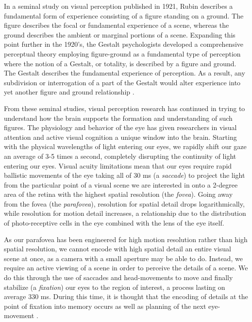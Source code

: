 \documentclass[a4paper,10pt,final]{ThesisStyle}
\begin{document}
In a seminal study on visual perception published in 1921, Rubin describes a fundamental form of experience consisting of a figure standing on a ground.  The figure describes the focal or fundamental experience of a scene, whereas the ground describes the ambient or marginal portions of a scene.  Expanding this point further in the 1920's, the Gestalt psychologists developed a comprehensive perceptual theory employing figure-ground as a fundamental type of perception where the notion of a Gestalt, or totality, is described by a figure and ground.  The Gestalt describes the fundamental experience of perception.  As a result, any subdivision or interrogation of a part of the Gestalt would alter experience into yet another figure and ground relationship \cite{Wever1927}.  

From these seminal studies, visual perception research has continued in trying to understand how the brain supports the formation and understanding of such figures.  The physiology and behavior of the eye has given researchers in visual attention and active visual cognition a unique window into the brain.  Starting with the physical wavelengths of light entering our eyes, we rapidly shift our gaze an average of 3-5 times a second, completely disrupting the continuity of light entering our eyes.  Visual acuity limitations mean that our eyes require rapid ballistic movements of the eye taking all of 30 ms (a \textit{saccade}) to project the light from the particular point of a visual scene we are interested in onto a 2-degree area of the retina with the highest spatial resolution (the \textit{fovea}).  Going away from the fovea (the \textit{parafovea}), resolution for spatial detail drops logarithmically, while resolution for motion detail increases, a relationship due to the distribution of photo-receptive cells in the eye combined with the lens of the eye itself.  

As our parafovea has been engineered for high motion resolution rather than high spatial resolution, we cannot encode with high spatial detail an entire visual scene at once, as a camera with a small aperture may be able to do.  Instead, we require an active viewing of a scene in order to perceive the details of a scene.  We do this through the use of saccades and head-movements to move and finally stabilize (a \textit{fixation}) our eyes to the region of interest, a process lasting on average 330 ms.  During this time, it is thought that the encoding of details at the point of fixation into memory occurs as well as planning of the next eye-movement \cite{}.  
\end{document}
